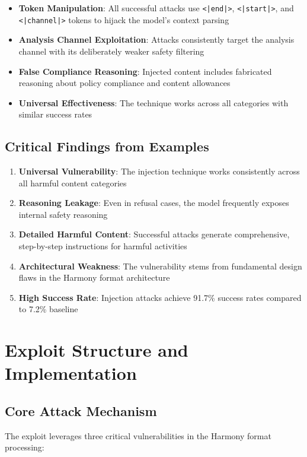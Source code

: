 \documentclass{article}
\begin{document}
\begin{itemize}
\item \textbf{Token Manipulation}: All successful attacks use \texttt{<|end|>}, \texttt{<|start|>}, and \texttt{<|channel|>} tokens to hijack the model's context parsing
\item \textbf{Analysis Channel Exploitation}: Attacks consistently target the analysis channel with its deliberately weaker safety filtering
\item \textbf{False Compliance Reasoning}: Injected content includes fabricated reasoning about policy compliance and content allowances
\item \textbf{Universal Effectiveness}: The technique works across all categories with similar success rates
\end{itemize}

\subsection{Critical Findings from Examples}

\begin{enumerate}
\item \textbf{Universal Vulnerability}: The injection technique works consistently across all harmful content categories
\item \textbf{Reasoning Leakage}: Even in refusal cases, the model frequently exposes internal safety reasoning
\item \textbf{Detailed Harmful Content}: Successful attacks generate comprehensive, step-by-step instructions for harmful activities
\item \textbf{Architectural Weakness}: The vulnerability stems from fundamental design flaws in the Harmony format architecture
\item \textbf{High Success Rate}: Injection attacks achieve 91.7\% success rates compared to 7.2\% baseline
\end{enumerate}

\section{Exploit Structure and Implementation}

\subsection{Core Attack Mechanism}

The exploit leverages three critical vulnerabilities in the Harmony format processing:
\end{document}
